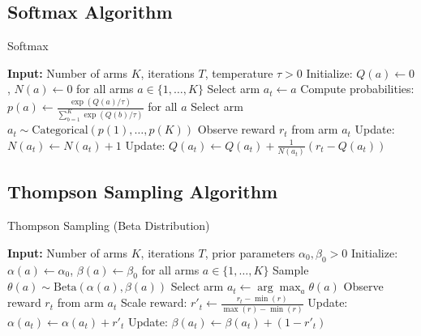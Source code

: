 \documentclass{article}
\begin{document}
\subsection{Softmax Algorithm}
\begin{algorithm}
\caption{Softmax}
\begin{algorithmic}
\State \textbf{Input:} Number of arms $K$, iterations $T$, temperature $\tau > 0$
\State Initialize: $Q(a) \gets 0$, $N(a) \gets 0$ for all arms $a \in \{1, \dots, K\}$
        \State Select arm $a_t \gets a$
    \Else
        \State Compute probabilities: $p(a) \gets \frac{\exp(Q(a)/\tau)}{\sum_{b=1}^K \exp(Q(b)/\tau)}$ for all $a$
        \State Select arm $a_t \sim \text{Categorical}(p(1), \dots, p(K))$
    \EndIf
    \State Observe reward $r_t$ from arm $a_t$
    \State Update: $N(a_t) \gets N(a_t) + 1$
    \State Update: $Q(a_t) \gets Q(a_t) + \frac{1}{N(a_t)} (r_t - Q(a_t))$
\EndFor
\end{algorithmic}
\end{algorithm}

\subsection{Thompson Sampling Algorithm}
\begin{algorithm}
\caption{Thompson Sampling (Beta Distribution)}
\begin{algorithmic}
\State \textbf{Input:} Number of arms $K$, iterations $T$, prior parameters $\alpha_0, \beta_0 > 0$
\State Initialize: $\alpha(a) \gets \alpha_0$, $\beta(a) \gets \beta_0$ for all arms $a \in \{1, \dots, K\}$
        \State Sample $\theta(a) \sim \text{Beta}(\alpha(a), \beta(a))$
    \EndFor
    \State Select arm $a_t \gets \arg\max_{a} \theta(a)$
    \State Observe reward $r_t$ from arm $a_t$
    \State Scale reward: $r'_t \gets \frac{r_t - \min(r)}{\max(r) - \min(r)}$ 
    \State Update: $\alpha(a_t) \gets \alpha(a_t) + r'_t$
    \State Update: $\beta(a_t) \gets \beta(a_t) + (1 - r'_t)$
\EndFor
\end{algorithmic}
\end{algorithm}
\end{document}
